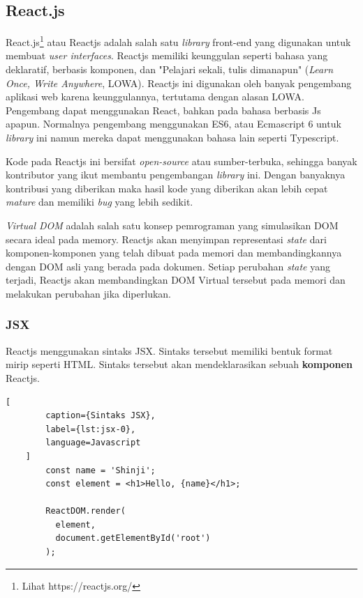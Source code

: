 \subsection{React.js}
    React.js\footnote{Lihat https://reactjs.org/} atau Reactjs adalah salah satu
    \textit{library} front-end yang digunakan untuk membuat \textit{user
    interfaces}\cite{facebook:react-homepage}. Reactjs memiliki keunggulan
    seperti bahasa yang deklaratif, berbasis komponen, dan "Pelajari sekali,
    tulis dimanapun" (\textit{Learn Once, Write Anywhere},
    LOWA)\cite{facebook:react-homepage}. Reactjs ini digunakan oleh banyak
    pengembang aplikasi web karena keunggulannya, tertutama dengan alasan LOWA.
    Pengembang dapat menggunakan React, bahkan pada bahasa berbasis Js apapun.
    Normalnya pengembang menggunakan ES6, atau Ecmascript 6 untuk
    \textit{library} ini namun mereka dapat menggunakan bahasa lain seperti
    Typescript\cite{typescript:react-ts}.
        
    Kode pada Reactjs ini bersifat \textit{open-source} atau sumber-terbuka,
    sehingga banyak kontributor yang ikut membantu pengembangan
    \textit{library} ini. Dengan banyaknya kontribusi yang diberikan maka
    hasil kode yang diberikan akan lebih cepat \textit{mature} dan memiliki
    \textit{bug} yang lebih sedikit.

    \textit{Virtual DOM} adalah salah satu konsep pemrograman yang simulasikan
    DOM secara ideal pada memory\cite{facebook:react-faq}. Reactjs akan
    menyimpan representasi \textit{state} dari komponen-komponen yang telah
    dibuat pada memori dan membandingkannya dengan DOM asli yang berada pada
    dokumen. Setiap perubahan \textit{state} yang terjadi, Reactjs akan
    membandingkan DOM Virtual tersebut pada memori dan melakukan perubahan jika
    diperlukan.
    
    \subsubsection{JSX}
    Reactjs menggunakan sintaks JSX. Sintaks tersebut memiliki bentuk format
    mirip seperti HTML. Sintaks tersebut akan mendeklarasikan sebuah
    \textbf{komponen} Reactjs.
    \begin{lstlisting}[
        caption={Sintaks JSX}, 
        label={lst:jsx-0}, 
        language=Javascript
    ]
        const name = 'Shinji';
        const element = <h1>Hello, {name}</h1>;
        
        ReactDOM.render(
          element,
          document.getElementById('root')
        );
    \end{lstlisting}
    
